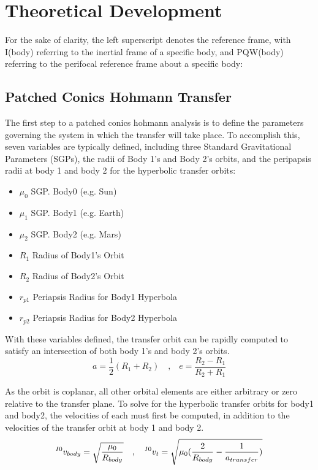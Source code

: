 \documentclass[conference]{IEEEtran}
\begin{document}
	\newpage
	
	\section{Theoretical Development}
	For the sake of clarity, the left superscript denotes the reference frame, with I(body) referring to the inertial frame of a specific body, and PQW(body) referring to the perifocal reference frame about a specific body:
	\subsection{Patched Conics Hohmann Transfer}
	
	The first step to a patched conics hohmann analysis is to define the parameters governing the system in which the transfer will take place. To accomplish this, seven variables are typically defined, including three Standard Gravitational Parameters (SGPs), the radii of Body 1's and Body 2's orbits, and the peripapsis radii at body 1 and body 2 for the hyperbolic transfer orbits:
	\begin{itemize}
		\item $\mu_0$ SGP. Body0 (e.g. Sun)
		\item $\mu_1$ SGP. Body1 (e.g. Earth)
		\item $\mu_2$ SGP. Body2 (e.g. Mars)
		\item $R_1$ Radius of Body1's Orbit
		\item $R_2$ Radius of Body2's Orbit
		\item $r_{p1}$ Periapsis Radius for Body1 Hyperbola
		\item $r_{p2}$ Periapsis Radius for Body2 Hyperbola
	\end{itemize}
	
	With these variables defined, the transfer orbit can be rapidly computed to satisfy an intersection of both body 1's and body 2's orbits.
	\[
	a = \frac{1}{2}(R_1 + R_2)
	\quad\text{,}\quad
	e = \frac{R_2 - R_1}{R_2 + R_1}
	\]
	
	As the orbit is coplanar, all other orbital elements are either arbitrary or zero relative to the transfer plane. To solve for the hyperbolic transfer orbits for body1 and body2, the velocities of each must first be computed, in addition to the velocities of the transfer orbit at body 1 and body 2.
	\[
		\prescript{I0}{}{v_{body}} = \sqrt{\frac{\mu_0}{R_{body}}}
		\quad\text{,}\quad
		\prescript{I0}{}{v_{t}} = \sqrt{\mu_0 (\frac{2}{R_{body}} - \frac{1}{a_{transfer}})}
	\]
	
\end{document}
